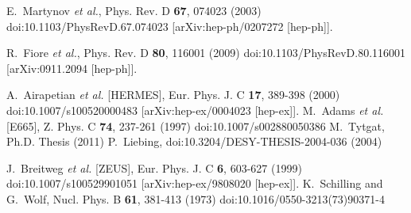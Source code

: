 \documentclass[10pt,prd,aps,nofootinbib,superscriptaddress]{revtex4}
\begin{document}
\begin{thebibliography}{99}
E.~Martynov {\it et al.},
Phys. Rev. D \textbf{67}, 074023 (2003)
doi:10.1103/PhysRevD.67.074023
[arXiv:hep-ph/0207272 [hep-ph]].

R.~Fiore {\it et al.},
Phys. Rev. D \textbf{80}, 116001 (2009)
doi:10.1103/PhysRevD.80.116001
[arXiv:0911.2094 [hep-ph]].

A.~Airapetian {\it et al.} [HERMES],
Eur. Phys. J. C \textbf{17}, 389-398 (2000)
doi:10.1007/s100520000483
[arXiv:hep-ex/0004023 [hep-ex]].
M.~Adams {\it et al.} [E665],
Z. Phys. C \textbf{74}, 237-261 (1997)
doi:10.1007/s002880050386
M.~Tytgat,
Ph.D. Thesis (2011)
P.~Liebing,
doi:10.3204/DESY-THESIS-2004-036 (2004)

J.~Breitweg {\it et al.} [ZEUS],
Eur. Phys. J. C \textbf{6}, 603-627 (1999)
doi:10.1007/s100529901051
[arXiv:hep-ex/9808020 [hep-ex]].
K.~Schilling and G.~Wolf,
Nucl. Phys. B \textbf{61}, 381-413 (1973)
doi:10.1016/0550-3213(73)90371-4

\end{thebibliography}
\end{document}
